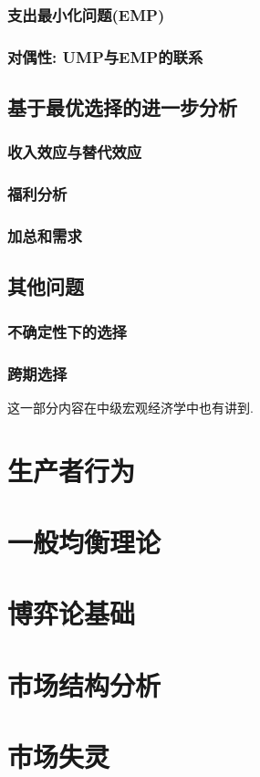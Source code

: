 \documentclass[lang=cn,10pt]{elegantbook}
\begin{document}
\subsection{支出最小化问题(EMP)}
\newpage

\subsection{对偶性: UMP与EMP的联系}
\newpage

\section{基于最优选择的进一步分析}
\newpage

\subsection{收入效应与替代效应}
\newpage

\subsection{福利分析}
\newpage

\subsection{加总和需求}
\newpage

\section{其他问题}
\newpage

\subsection{不确定性下的选择}
\newpage

\subsection{跨期选择}
这一部分内容在中级宏观经济学中也有讲到.
\newpage

\chapter{生产者行为}
\chapter{一般均衡理论}
\chapter{博弈论基础}
\chapter{市场结构分析}
\chapter{市场失灵}
\end{document}

